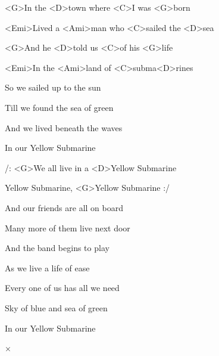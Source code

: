 

\zs
<G>In the <D>town where <C>I was <G>born

<Emi>Lived a <Ami>man who <C>sailed the <D>sea

<G>And he <D>told us <C>of his <G>life

<Emi>In the <Ami>land of <C>subma<D>rines
\ks

\zs
So we sailed up to the sun

Till we found the sea of green

And we lived beneath the waves

In our Yellow Submarine
\ks

\zr
/: <G>We all live in a <D>Yellow Submarine

Yellow Submarine, <G>Yellow Submarine :/
\kr

\zs
And our friends are all on board

Many more of them live next door

And the band begins to play
\ks

\zr \kr

\zs
As we live a life of ease

Every one of us has all we need

Sky of blue and sea of green

In our Yellow Submarine
\ks

× \kr

\kp
